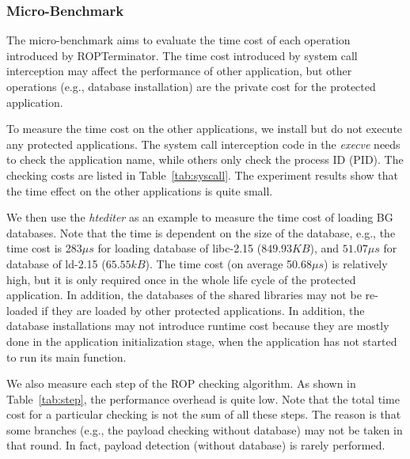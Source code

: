 \subsubsection{Micro-Benchmark}
The micro-benchmark aims to evaluate the time cost of each operation introduced by ROPTerminator. %
The time cost introduced by system call interception may affect the performance of other application, but other operations (e.g., database installation) are the private cost for the protected application. %

To measure the time cost on the other applications, we install \name but do not execute any protected applications. The system call interception code in the \emph{execve} needs to check the application name, while others only check the process ID (PID). The checking costs are listed in Table~\ref{tab:syscall}. The experiment results show that the time effect on the other applications is quite small.

We then use the \emph{htediter} as an example to measure the time cost of loading BG databases. Note that the time is dependent on the size of the database, e.g., the time cost is 283$\mu s$ for loading database of libc-2.15 ($849.93KB$), and $51.07\mu s$ for database of ld-2.15 ($65.55kB$). The time cost (on average 50.68$\mu s$) is relatively high, but it is only required once in the whole life cycle of the protected application. In addition, the databases of the shared libraries may not be re-loaded if they are loaded by other protected applications. In addition, the database installations may not introduce runtime cost because they are mostly done in the application initialization stage, when the application has not started to run its main function.

We also measure each step of the ROP checking algorithm. As shown in Table~\ref{tab:step}, the performance overhead is quite low. Note that the total time cost for a particular checking is not the sum of all these steps. The reason is that some branches (e.g., the payload checking without database) may not be taken in that round. In fact, payload detection (without database) is rarely performed.


